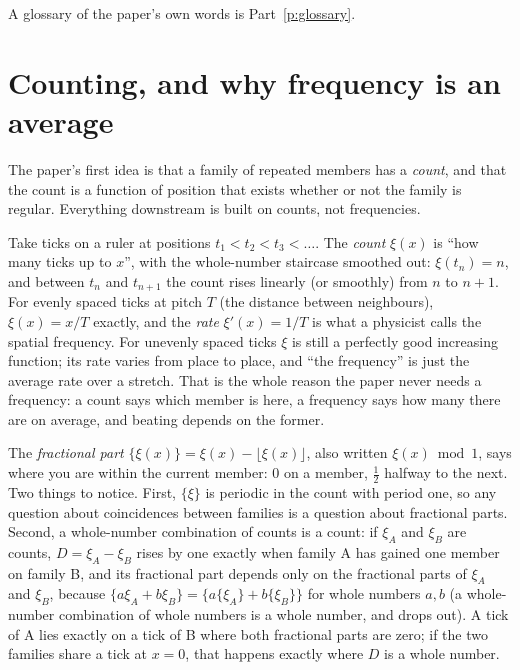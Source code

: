 \documentclass[10pt]{article}
\theoremstyle{plain}
\theoremstyle{definition}
\newcommand{\cnt}{\xi}
\begin{document}
A glossary of the paper's own words is Part~\ref{p:glossary}.

\section{Counting, and why frequency is an average}
\label{p:count}

\begin{why}
The paper's first idea is that a family of repeated members has a
\emph{count}, and that the count is a function of position that exists
whether or not the family is regular. Everything downstream is built on
counts, not frequencies.
\end{why}

Take ticks on a ruler at positions $t_1<t_2<t_3<\dots$. The \emph{count}
$\cnt(x)$ is ``how many ticks up to $x$'', with the whole-number staircase
smoothed out: $\cnt(t_n)=n$, and between $t_n$ and $t_{n+1}$ the count rises
linearly (or smoothly) from $n$ to $n+1$. For evenly spaced ticks at pitch
$T$ (the distance between neighbours), $\cnt(x)=x/T$ exactly, and the
\emph{rate} $\cnt'(x)=1/T$ is what a physicist calls the spatial frequency.
For unevenly spaced ticks $\cnt$ is still a perfectly good increasing
function; its rate varies from place to place, and ``the frequency'' is just
the average rate over a stretch. That is the whole reason the paper never
needs a frequency: a count says which member is here, a frequency says how
many there are on average, and beating depends on the former.

The \emph{fractional part} $\{\cnt(x)\}=\cnt(x)-\lfloor\cnt(x)\rfloor$, also
written $\cnt(x)\bmod1$, says where you are within the current member: $0$
on a member, $\tfrac12$ halfway to the next. Two things to notice. First,
$\{\cnt\}$ is periodic in the count with period one, so any question about
coincidences between families is a question about fractional parts.
Second, a whole-number combination of counts is a count: if $\cnt_A$ and
$\cnt_B$ are counts, $D=\cnt_A-\cnt_B$ rises by one exactly when family A
has gained one member on family B, and its fractional part depends only on
the fractional parts of $\cnt_A$ and $\cnt_B$, because
$\{a\cnt_A+b\cnt_B\}=\{a\{\cnt_A\}+b\{\cnt_B\}\}$ for whole numbers $a,b$
(a whole-number combination of whole numbers is a whole number, and drops
out). A tick of A lies exactly on a tick of B where both fractional parts
are zero; if the two families share a tick at $x=0$, that happens exactly
where $D$ is a whole number.
\end{document}
